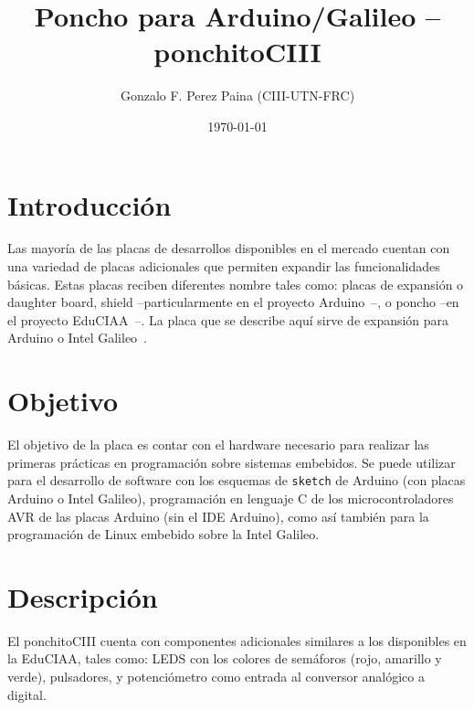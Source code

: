 \documentclass[a4paper]{article}
\title{Poncho para Arduino/Galileo -- ponchitoCIII}
\author{Gonzalo F. Perez Paina (CIII-UTN-FRC)}
\date{\today}
\begin{document}
\maketitle

\section{Introducción}
Las mayoría de las placas de desarrollos disponibles en el mercado cuentan con una variedad de placas adicionales que permiten expandir las funcionalidades básicas.
Estas placas reciben diferentes nombre tales como: placas de expansión o daughter board, shield --particularmente en el proyecto Arduino~\cite{Arduino}--, o poncho --en el proyecto EduCIAA~\cite{EduCIAA}--.
La placa que se describe aquí sirve de expansión para Arduino o Intel Galileo~\cite{Galileo}. 

\section{Objetivo}

El objetivo de la placa es contar con el hardware necesario para realizar las primeras prácticas en programación sobre sistemas embebidos. 
Se puede utilizar para el desarrollo de software con los esquemas de \texttt{sketch} de Arduino (con placas Arduino o Intel Galileo), programación en lenguaje C de los microcontroladores AVR de las placas Arduino (sin el IDE Arduino), como así también para la programación de Linux embebido sobre la Intel Galileo.

\section{Descripción}
El ponchitoCIII cuenta con componentes adicionales similares a los disponibles en la EduCIAA, tales como: LEDS con los colores de semáforos (rojo, amarillo y verde), pulsadores, y potenciómetro como entrada al conversor analógico a digital.
\end{document}
